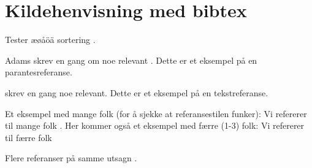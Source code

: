 
\section{Kildehenvisning med bibtex}

Tester æøåöä sortering \citep{aa, ae, oe, oo, ee}.

Adams skrev en gang om noe relevant \citep[s.123]{adams1995}. Dette er et eksempel på en parantesreferanse.

\citet{adams1995} skrev en gang noe relevant. Dette er et eksempel på en tekstreferanse.

Et eksempel med mange folk (for å sjekke at referansestilen funker): Vi refererer til mange folk \citep{mangefolk}. Her kommer også et eksempel med færre (1-3) folk: Vi refererer til færre folk \citep{faafolk}

Flere referanser på samme utsagn \citep{faafolk,adams1995}.


